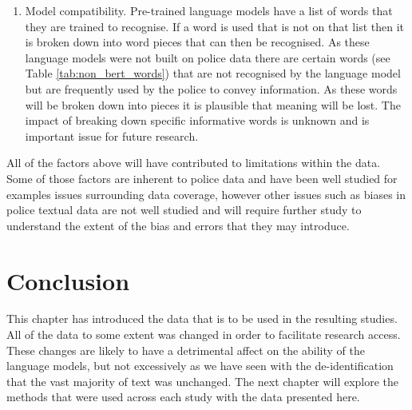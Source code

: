 \begin{enumerate}
    \item Model compatibility. Pre-trained language models have a list of words that they are trained to recognise. If a word is used that is not on that list then it is broken down into word pieces that can then be recognised. As these language models were not built on police data there are certain words (see Table \ref{tab:non_bert_words}) that are not recognised by the language model but are frequently used by the police to convey information. As these words will be broken down into pieces it is plausible that meaning will be lost. The impact of breaking down specific informative words is unknown and is important issue for future research.
    
\end{enumerate}


All of the factors above will have contributed to limitations within the data. Some of those factors are inherent to police data and have been well studied for examples issues surrounding data coverage, however other issues such as biases in police textual data are not well studied and will require further study to understand the extent of the bias and errors that they may introduce.

\section{Conclusion} This chapter has introduced the data that is to be used in the resulting studies. All  of the data to some extent was changed in order to facilitate research access. These changes are likely to have a detrimental affect on the ability of the language models, but not excessively as we have seen with the de-identification that the vast majority of text was unchanged. The next chapter will explore the methods that were used across each study with the data presented here.







